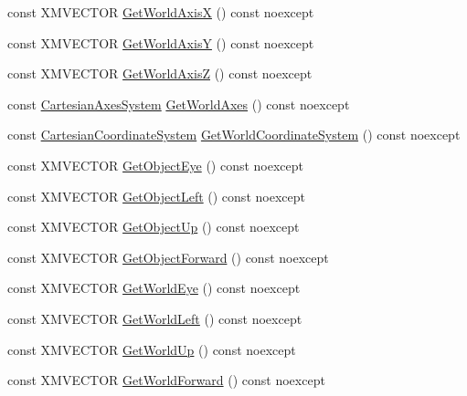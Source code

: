 \begin{DoxyCompactItemize}
\item 
const X\+M\+V\+E\+C\+T\+OR \hyperlink{structmage_1_1_transform_node_a14a5604bcaa467c748f543092037ace6}{Get\+World\+AxisX} () const noexcept
\item 
const X\+M\+V\+E\+C\+T\+OR \hyperlink{structmage_1_1_transform_node_a94393cbc9a2a1270e2d52207233d6135}{Get\+World\+AxisY} () const noexcept
\item 
const X\+M\+V\+E\+C\+T\+OR \hyperlink{structmage_1_1_transform_node_a1e404dbe189d7fd326c4816d987759b6}{Get\+World\+AxisZ} () const noexcept
\item 
const \hyperlink{structmage_1_1_cartesian_axes_system}{Cartesian\+Axes\+System} \hyperlink{structmage_1_1_transform_node_aca4f35bb8aaffabc8c825133a7a307e9}{Get\+World\+Axes} () const noexcept
\item 
const \hyperlink{structmage_1_1_cartesian_coordinate_system}{Cartesian\+Coordinate\+System} \hyperlink{structmage_1_1_transform_node_a511e55c63c15d9e8958f33b298b6c103}{Get\+World\+Coordinate\+System} () const noexcept
\item 
const X\+M\+V\+E\+C\+T\+OR \hyperlink{structmage_1_1_transform_node_a627c3494fb3bd47551bbc48ad64369f5}{Get\+Object\+Eye} () const noexcept
\item 
const X\+M\+V\+E\+C\+T\+OR \hyperlink{structmage_1_1_transform_node_a674580a5f7f8926e5b1e9ce7ac312cb2}{Get\+Object\+Left} () const noexcept
\item 
const X\+M\+V\+E\+C\+T\+OR \hyperlink{structmage_1_1_transform_node_ab045712f4aa08651b2a43b1883e8c3fc}{Get\+Object\+Up} () const noexcept
\item 
const X\+M\+V\+E\+C\+T\+OR \hyperlink{structmage_1_1_transform_node_a4340e1f87d15589e3d763c0f124037bd}{Get\+Object\+Forward} () const noexcept
\item 
const X\+M\+V\+E\+C\+T\+OR \hyperlink{structmage_1_1_transform_node_a413f7786329b48226572acde4174e484}{Get\+World\+Eye} () const noexcept
\item 
const X\+M\+V\+E\+C\+T\+OR \hyperlink{structmage_1_1_transform_node_af021782ea162e0aa8c891b794d204632}{Get\+World\+Left} () const noexcept
\item 
const X\+M\+V\+E\+C\+T\+OR \hyperlink{structmage_1_1_transform_node_a9d545f02c9d8062a29b236a94c8c2136}{Get\+World\+Up} () const noexcept
\item 
const X\+M\+V\+E\+C\+T\+OR \hyperlink{structmage_1_1_transform_node_a4737be175d69768d353f500636502296}{Get\+World\+Forward} () const noexcept
\item 

\end{DoxyCompactItemize}
